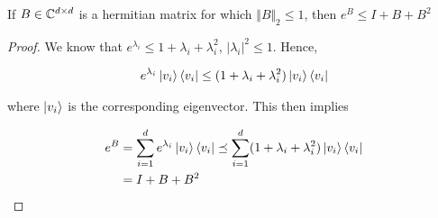 \documentclass[main.tex]{subfiles}
\begin{document}
\begin{subappendices}
\begin{lemma}
\label{lemma:exp-eigen-approx}
If $B \in \mathbb{C}^{d \times d}$ is a hermitian matrix for which $\Vert B \Vert_2 \leq 1$, then $e^{B} \leq I + B + B^2$

\begin{proof}
	We know that $e^{\lambda_i} \leq 1 + \lambda_i + \lambda_i^2$, $|\lambda_i|^2 \leq 1$. Hence,
	
	\begin{align*}
	e^{\lambda_i} \ket{v_i}\bra{v_i} \leq (1 + \lambda_i + \lambda_i^2) 	\ket{v_i}\bra{v_i}
	\end{align*}

	where $\ket{v_i}$ is the corresponding eigenvector. This then implies
	
	\begin{align*}
	e^B &= \sum_{i=1}^d e^{\lambda_i} \ket{v_i}\bra{v_i} \preceq \sum_{i=1}^d (1 + \lambda_i + \lambda_i^2) \ket{v_i}\bra{v_i} \\
	&= I + B + B^2
	\end{align*}
\end{proof}
\end{lemma}

\end{subappendices}
\end{document}
